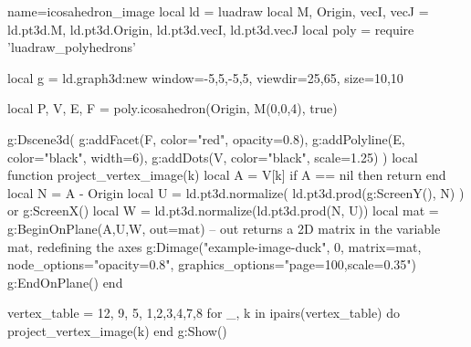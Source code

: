 \documentclass{standalone}
\begin{document}
\begin{luadraw}{name=icosahedron_image}
local ld = luadraw
local M, Origin, vecI, vecJ = ld.pt3d.M, ld.pt3d.Origin, ld.pt3d.vecI, ld.pt3d.vecJ
local poly = require 'luadraw_polyhedrons'

local g = ld.graph3d:new{
    window={-5,5,-5,5}, 
    viewdir={25,65}, size={10,10}
}

local P, V, E, F = poly.icosahedron(Origin, M(0,0,4), true)

g:Dscene3d(
    g:addFacet(F, {color="red", opacity=0.8}),
    g:addPolyline(E, {color="black", width=6}),
    g:addDots(V, {color="black", scale=1.25})
)
local function project_vertex_image(k)
    local A = V[k]
    if A == nil then
        return
    end
    local N = A - Origin
    local U = ld.pt3d.normalize( ld.pt3d.prod(g:ScreenY(), N) ) or g:ScreenX()
    local W = ld.pt3d.normalize(ld.pt3d.prod(N, U))
    local mat = {}
    g:BeginOnPlane({A,U,W}, {out=mat}) -- out returns a 2D matrix in the variable mat, redefining the axes
        g:Dimage("example-image-duck", 0,
            {matrix=mat, node_options="opacity=0.8", graphics_options="page=100,scale=0.35"})
    g:EndOnPlane()
end

vertex_table = {12, 9, 5, 1,2,3,4,7,8}
for _, k in ipairs(vertex_table) do
    project_vertex_image(k)
end
g:Show()
\end{luadraw}
\end{document}
